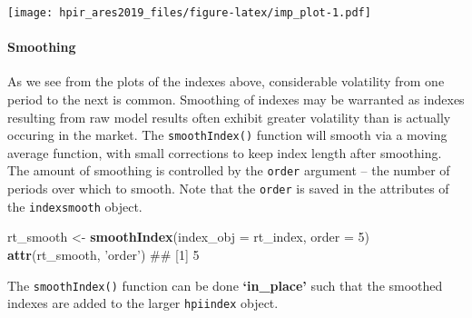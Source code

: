 \documentclass[]{article}
\newenvironment{Shaded}{\begin{snugshade}}{\end{snugshade}}
\newcommand{\KeywordTok}[1]{\textcolor[rgb]{0.13,0.29,0.53}{\textbf{#1}}}
\newcommand{\DataTypeTok}[1]{\textcolor[rgb]{0.13,0.29,0.53}{#1}}
\newcommand{\DecValTok}[1]{\textcolor[rgb]{0.00,0.00,0.81}{#1}}
\newcommand{\StringTok}[1]{\textcolor[rgb]{0.31,0.60,0.02}{#1}}
\newcommand{\OtherTok}[1]{\textcolor[rgb]{0.56,0.35,0.01}{#1}}
\newcommand{\OperatorTok}[1]{\textcolor[rgb]{0.81,0.36,0.00}{\textbf{#1}}}
\newcommand{\NormalTok}[1]{#1}
\let\oldparagraph\paragraph
\renewcommand{\paragraph}[1]{\oldparagraph{#1}\mbox{}}
\begin{document}
\begin{Shaded}
\end{Shaded}

\texttt{[image: hpir\_ares2019\_files/figure-latex/imp\_plot-1.pdf]}

\paragraph{Smoothing}\label{smoothing}

As we see from the plots of the indexes above, considerable volatility
from one period to the next is common. Smoothing of indexes may be
warranted as indexes resulting from raw model results often exhibit
greater volatility than is actually occuring in the market. The
\texttt{smoothIndex()} function will smooth via a moving average
function, with small corrections to keep index length after smoothing.
The amount of smoothing is controlled by the \texttt{order} argument --
the number of periods over which to smooth. Note that the \texttt{order}
is saved in the attributes of the \texttt{indexsmooth} object.

\begin{Shaded}
\begin{Highlighting}[]
\NormalTok{  rt_smooth <-}\StringTok{ }\KeywordTok{smoothIndex}\NormalTok{(}\DataTypeTok{index_obj =}\NormalTok{ rt_index,}
                           \DataTypeTok{order =} \DecValTok{5}\NormalTok{)}
  \KeywordTok{attr}\NormalTok{(rt_smooth, }\StringTok{'order'}\NormalTok{)}
\NormalTok{## [1] 5}
\end{Highlighting}
\end{Shaded}

The \texttt{smoothIndex()} function can be done \textbf{`in\_place'}
such that the smoothed indexes are added to the larger \texttt{hpiindex}
object.
\end{document}
